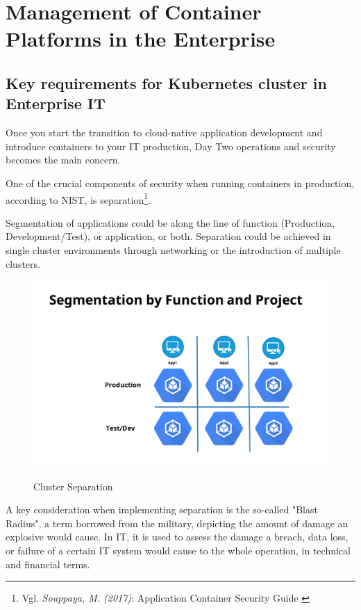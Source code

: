 %
%

\pagebreak
\section{Management of Container Platforms in the Enterprise}

\onehalfspacing

\subsection{Key requirements for Kubernetes cluster in Enterprise IT}

Once you start the transition to cloud-native application development and introduce containers to your IT production, Day Two operations and security becomes the main concern.

One of the crucial components of security when running containers in production, according to NIST, is separation\footnote{Vgl. \textit{Souppaya, M. (2017)}: Application Container Security Guide \cite{sp800-190}}.

Segmentation of applications could be along the line of function (Production, Development/Test), or application, or both. Separation could be achieved in single cluster environments through networking or the introduction of multiple clusters. 

\begin{figure}[h]
\centering
\caption {Cluster Separation}
\includegraphics[width=\linewidth]{images/separation}
\label{fig:clusterSeparation}
\end{figure}

A key consideration when implementing separation is the so-called "Blast Radius", a term borrowed from the military, depicting the amount of damage an explosive would cause. In IT, it is used to assess the damage a breach, data loss, or failure of a certain IT system would cause to the whole operation, in technical and financial terms.


